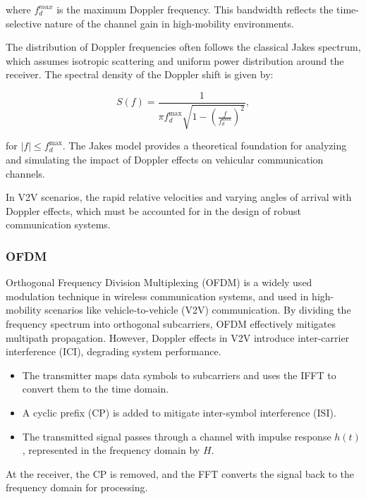 where $f_d^{max}$ is the maximum Doppler frequency. This bandwidth reflects the time-selective nature of the channel gain in high-mobility environments.

The distribution of Doppler frequencies often follows the classical Jakes spectrum, which assumes isotropic scattering and uniform power distribution around the receiver. The spectral density of the Doppler shift is given by:

\begin{equation}
S(f) = \frac{1}{\pi f_d^{\text{max}} \sqrt{1 - \left( \frac{f}{f_d^{\text{max}}} \right)^2 }},
\label{eq:jakes_spectrum}
\end{equation}

for $|f| \leq f_d^{\text{max}}$. The Jakes model provides a theoretical foundation for analyzing and simulating the impact of Doppler effects on vehicular communication channels.

In V2V scenarios, the rapid relative velocities and varying angles of arrival with Doppler effects, which must be accounted for in the design of robust communication systems.

\subsubsection{OFDM}

Orthogonal Frequency Division Multiplexing (OFDM) is a widely used modulation technique in wireless communication systems, and used in high-mobility scenarios like vehicle-to-vehicle (V2V) communication. By dividing the frequency spectrum into orthogonal subcarriers, OFDM effectively mitigates multipath propagation. However, Doppler effects in V2V introduce inter-carrier interference (ICI), degrading system performance.

\begin{itemize}
    \item The transmitter maps data symbols to subcarriers and uses the IFFT to convert them to the time domain.
    \item A cyclic prefix (CP) is added to mitigate inter-symbol interference (ISI).
    \item The transmitted signal passes through a channel with impulse response \( h(t) \), represented in the frequency domain by \( H \).
\end{itemize}
At the receiver, the CP is removed, and the FFT converts the signal back to the frequency domain for processing.

